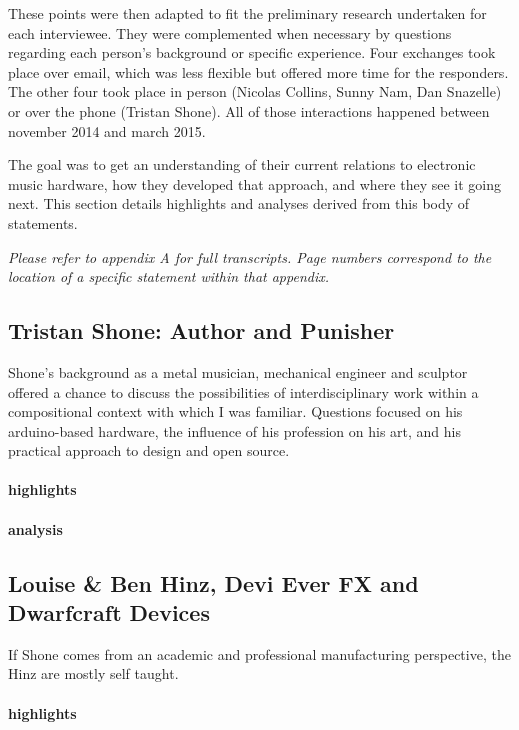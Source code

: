 These points were then adapted to fit the preliminary research undertaken for each interviewee. They were complemented when necessary by questions regarding each person's background or specific experience. Four exchanges took place over email, which was less flexible but offered more time for the responders. The other four took place in person (Nicolas Collins, Sunny Nam, Dan Snazelle) or over the phone (Tristan Shone). All of those interactions happened between november 2014 and march 2015. 

The goal was to get an understanding of their current relations to electronic music hardware, how they developed that approach, and where they see it going next. This section details highlights and analyses derived from this body of statements. 

\emph{Please refer to appendix A for full transcripts. Page numbers correspond to the location of a specific statement within that appendix. }

\subsection{Tristan Shone: Author and Punisher}

Shone's background as a metal musician, mechanical engineer and sculptor offered a chance to discuss the possibilities of interdisciplinary work within a compositional context with which I was familiar. Questions focused on his arduino-based hardware, the influence of his profession on his art, and his practical approach to design and open source. 




\paragraph{highlights}
\paragraph{analysis}



\subsection{Louise \& Ben Hinz, Devi Ever FX and Dwarfcraft Devices}

If Shone comes from an academic and professional manufacturing perspective, the Hinz are mostly self taught. 

\paragraph{highlights}
